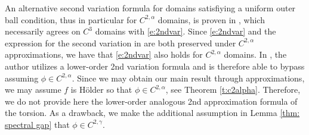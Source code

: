 \documentclass[10pt, reqno]{amsart}
\numberwithin{equation}{section}
\begin{document}
An alternative second variation formula for domains satisfiying a uniform outer ball condition, thus in particular for $C^{2,\alpha}$ domains, is proven in \cite[Proposition 11]{Laurain}, which necessarily agrees on $C^3$ domains with \eqref{e:2ndvar}. 
Since \eqref{e:2ndvar} and the expression for the second variation in \cite[Proposition 11]{Laurain} are both preserved under $C^{2,\alpha}$ approximations, we have that \eqref{e:2ndvar} also holds for $C^{2,\alpha}$ domains. In \cite{p24}, the author utilizes a lower-order 2nd variation formula and is therefore able to bypass assuming $\phi \in C^{2,\alpha}$. Since we may obtain our main result through approximations, we may assume $f$ is H\"older so that $\phi \in C^{2,\alpha}$, see Theorem \ref{t:c2alpha}. Therefore, we do not provide here the lower-order analogous 2nd approximation formula of the torsion. As a drawback, we make the additional assumption in Lemma \ref{thm: spectral gap} that $\phi \in C^{2,\gamma}$. 
\end{document}
